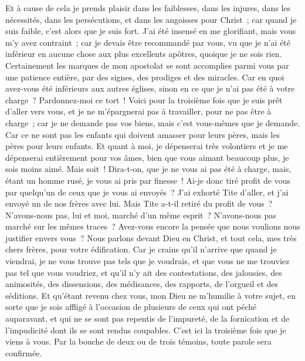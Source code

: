 \begin{multicols}{2}
Et à cause de cela je prends plaisir dans les faiblesses, dans les injures, dans les nécessités, dans les persécutions, et dans les angoisses pour Christ~; car quand je suis faible, c'est alors que je suis fort.
J'ai été insensé en me glorifiant, mais vous m'y avez contraint~; car je devais être recommandé par vous, vu que je n'ai été inférieur en aucune chose aux plus excellents apôtres, quoique je ne sois rien.
Certainement les marques de mon apostolat se sont accomplies parmi vous par une patience entière, par des signes, des prodiges et des miracles.
Car en quoi avez-vous été inférieurs aux autres églises, sinon en ce que je n'ai pas été à votre charge~? Pardonnez-moi ce tort~!
Voici pour la troisième fois que je suis prêt d'aller vers vous, et je ne m'épargnerai pas à travailler, pour ne pas être à charge~; car je ne demande pas vos biens, mais c'est vous-mêmes que je demande. Car ce ne sont pas les enfants qui doivent amasser pour leurs pères, mais les pères pour leurs enfants.
Et quant à moi, je dépenserai très volontiers et je me dépenserai entièrement pour vos âmes, bien que vous aimant beaucoup plus, je sois moins aimé.
Mais soit~! Dira-t-on, que je ne vous ai pas été à charge, mais, étant un homme rusé, je vous ai pris par finesse~!
Ai-je donc tiré profit de vous par quelqu'un de ceux que je vous ai envoyés~?
J'ai exhorté Tite d'aller, et j'ai envoyé un de nos frères avec lui. Mais Tite a-t-il retiré du profit de vous~? N'avons-nous pas, lui et moi, marché d'un même esprit~? N'avons-nous pas marché sur les mêmes traces~?
Avez-vous encore la pensée que nous voulions nous justifier envers vous~? Nous parlons devant Dieu en Christ, et tout cela, mes très chers frères, pour votre édification.
Car je crains qu'il n'arrive que quand je viendrai, je ne vous trouve pas tels que je voudrais, et que vous ne me trouviez pas tel que vous voudriez, et qu'il n'y ait des contestations, des jalousies, des animosités, des dissensions, des médisances, des rapports, de l'orgueil et des séditions.
Et qu'étant revenu chez vous, mon Dieu ne m'humilie à votre sujet, en sorte que je sois affligé à l'occasion de plusieurs de ceux qui ont péché auparavant, et qui ne se sont pas repentis de l'impureté, de la fornication et de l'impudicité dont ils se sont rendus coupables.
\VerseOne{}C'est ici la troisième fois que je viens à vous. Par la bouche de deux ou de trois témoins, toute parole sera confirmée.

\end{multicols}
